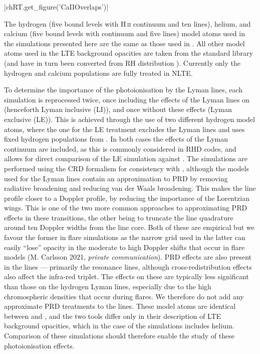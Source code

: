 \py[TimeDepRT]|chRT.get_figure('CaIIOverlaps')|

The hydrogen (five bound levels with H\,\textsc{ii} continuum and ten lines), helium, and calcium (five bound \Caii{} levels with \Caiii{} continuum and five lines) model atoms used in the simulations presented here are the same as those used in \Radyn{}.
All other model atoms used in the LTE background opacities are taken from the \Lw{} standard library (and have in turn been converted from  RH distribution \citep{Uitenbroek2001}).
Currently only the hydrogen and calcium populations are fully treated in NLTE.

To determine the importance of the photoionisation by the Lyman lines, each \Radyn{} simulation is reprocessed twice, once including the effects of the Lyman lines on \Caii{} (henceforth Lyman inclusive (LI)), and once without these effects (Lyman exclusive (LE)).
This is achieved through the use of two different hydrogen model atoms, where the one for the LE treatment excludes the Lyman lines and uses fixed hydrogen populations from \Radyn{}.
In both cases the effects of the Lyman continuum are included, as this is commonly considered in RHD codes, and allows for direct comparison of the LE simulation against \Radyn{}.
The simulations are performed using the CRD formalism for consistency with \Radyn{}, although the models used for the Lyman lines contain an approximation to PRD by removing radiative broadening and reducing van der Waals broadening.
This makes the line profile closer to a Doppler profile, by reducing the importance of the Lorentzian wings.
This is one of the two more common approaches to approximating PRD effects in these transitions, the other being to truncate the line quadrature around ten Doppler widths from the line core.
Both of these are empirical but we favour the former in flare simulations as the narrow grid used in the latter can easily ``lose'' opacity in the moderate to high Doppler shifts that occur in flare models (M. Carlsson 2021, \emph{private communication}).
PRD effects are also present in the \Caii{} lines --- primarily the resonance lines, although cross-redistribution effects also affect the infra-red triplet.
The effects on these are typically less significant than those on the hydrogen Lyman lines, especially due to the high chromospheric densities that occur during flares.
We therefore do not add any approximate PRD treatments to the \Caii{} lines.
These model atoms are identical between \Radyn{} and \Lw{}, and the two tools differ only in their description of LTE background opacities, which in the case of the \Lw{} simulations includes helium.
Comparison of these simulations should therefore enable the study of these photoionisation effects.

